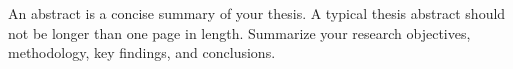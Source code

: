 

\begin{abstract*}

An abstract is a concise summary of your thesis. A typical thesis abstract
should not be longer than one page in length. Summarize your research
objectives, methodology, key findings, and conclusions.


\end{abstract*}


\begin{abstract}

请在此处撰写中文摘要。摘要应简要概括论文的研究目的、方法、主要发现和结论。


\end{abstract}
